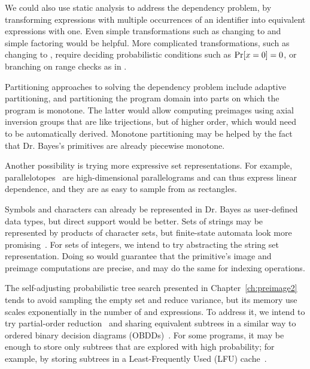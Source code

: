 We could also use static analysis to address the dependency problem, by transforming expressions with multiple occurrences of an identifier into equivalent expressions with one.
Even simple transformations such as changing  to  and simple factoring would be helpful.
More complicated transformations, such as changing  to , require deciding probabilistic conditions such as $\mathrm{Pr}\!\left[{x = 0}\right] = 0$, or branching on range checks as in .

Partitioning approaches to solving the dependency problem include adaptive partitioning, and partitioning the program domain into parts on which the program is monotone.
The latter would allow computing preimages using axial inversion groups that are like trijections, but of higher order, which would need to be automatically derived.
Monotone partitioning may be helped by the fact that Dr. Bayes's primitives are already piecewise monotone.

Another possibility is trying more expressive set representations.
For example, parallelotopes~\cite{cit:amato-2012tcs-parallelotopes} are high-dimensional parallelograms and can thus express linear dependence, and they are as easy to sample from as rectangles.

Symbols and characters can already be represented in Dr. Bayes as user-defined data types, but direct support would be better.
Sets of strings may be represented by products of character sets, but finite-state automata look more promising~\cite{cit:shannon-2007-strings}.
For sets of integers, we intend to try abstracting the string set representation.
Doing so would guarantee that the  primitive's image and preimage computations are precise, and may do the same for indexing operations.

The self-adjusting probabilistic tree search presented in Chapter~\ref{ch:preimage2} tends to avoid sampling the empty set and reduce variance, but its memory use scales exponentially in the number of  and  expressions.
To address it, we intend to try partial-order reduction~\cite{cit:godefroid-thesis} and sharing equivalent subtrees in a similar way to ordered binary decision diagrams (OBDDs)~\cite{cit:meinel-1998book-obdd}.
For some programs, it may be enough to store only subtrees that are explored with high probability; for example, by storing subtrees in a Least-Frequently Used (LFU) cache~\cite{cit:maffeis-1993-cache}.

